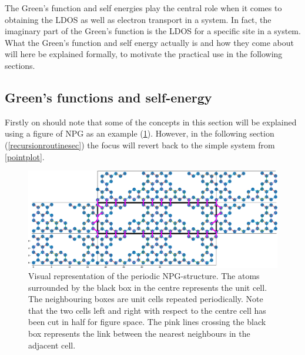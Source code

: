 The Green's function and self energies play the central role when it comes to obtaining the LDOS as well as electron transport in a system. In fact, the imaginary part of the Green's function is the LDOS for a specific site in a system. What the Green's function and self energy actually is and how they come about will here be explained formally, to motivate the practical use in the following sections.\subsection{Green's functions and self-energy}\label{greensandself} 
Firstly on should note that some of the concepts in this section will be explained using a figure of NPG as an example (\cref{atomrepfig}). However, in the following section (\cref{recursionroutinesec}) the focus will revert back to the simple system from \cref{pointplot}. \begin{figure}[H]
	\centering
	\includegraphics[width=\textwidth]{Figures/representativestructure2.eps}
	\caption{Visual representation of the periodic NPG-structure. The atoms surrounded by the black box in the centre represents the unit cell. The neighbouring boxes are unit cells repeated periodically. Note that the two cells left and right with respect to the centre cell has been cut in half for figure space. The pink lines crossing the black box represents the link between the nearest neighbours in the adjacent cell.}
	\label{atomrepfig}
\end{figure}
